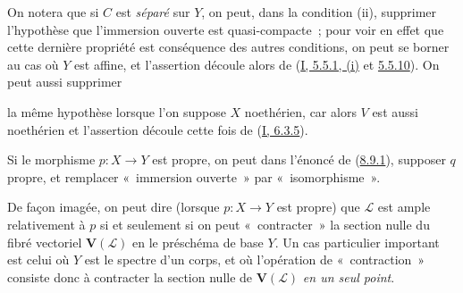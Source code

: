 On notera que si $C$ est \emph{séparé} sur $Y$, on peut, dans la condition
(ii), supprimer l'hypothèse que l'immersion ouverte est quasi-compacte~; pour
voir en effet que cette dernière propriété est conséquence des autres
conditions, on peut se borner au cas où $Y$ est affine, et l'assertion découle
alors de (\hyperref[I.5.5.1-fr]{I, 5.5.1, (i)} et
\hyperref[I.5.5.10-fr]{5.5.10}). On peut aussi supprimer

la même hypothèse lorsque l'on suppose $X$ noethérien, car alors $V$ est aussi
noethérien et l'assertion découle cette fois de
(\hyperref[I.6.3.5-fr]{I, 6.3.5}).

\begin{corollary}[8.9.2]
\label{II.8.9.2-fr}
Si le morphisme $p:X\to Y$ est propre, on peut dans l'énoncé de
(\hyperref[II.8.9.1-fr]{8.9.1}), supposer $q$ propre, et remplacer
«~immersion ouverte~» par «~isomorphisme~».
\end{corollary}

De façon imagée, on peut dire (lorsque $p:X\to Y$ est propre) que
$\mathcal{L}$ est ample relativement à $p$ si et seulement si on peut
«~contracter~» la section nulle du fibré vectoriel $\mathbf{V}(\mathcal{L})$
en le préschéma de base $Y$. Un cas particulier important est celui où $Y$
est le spectre d'un corps, et où l'opération de «~contraction~» consiste donc
à contracter la section nulle de $\mathbf{V}(\mathcal{L})$ \emph{en un seul
point}.

